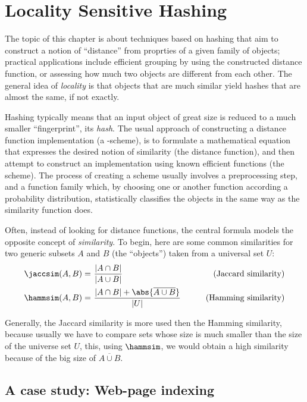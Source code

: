 \chapter{Locality Sensitive Hashing}

The topic of this chapter is about techniques based on hashing that aim to construct a notion of ``distance'' from proprties of a given family of objects; practical applications include efficient grouping by using the constructed distance function, or assessing how much two objects are different from each other. The general idea of \emph{locality} is that objects that are much similar yield hashes that are almost the same, if not exactly.

Hashing typically means that an input object of great size is reduced to a much smaller ``fingerprint'', its \emph{hash}. The usual approach of constructing a distance function implementation (a \lsh-scheme), is to formulate a mathematical equation that expresses the desired notion of similarity (the distance function), and then attempt to construct an implementation using known efficient functions (the scheme). The process of creating a scheme usually involves a preprocessing step, and a function family which, by choosing one or another function according a probability distribution, statistically classifies the objects in the same way as the similarity function does.

Often, instead of looking for distance functions, the central formula models the opposite concept of \emph{similarity}. To begin, here are some common similarities for two generic subsets $A$ and $B$ (the ``objects'') taken from a universal set $U$:
\begin{align*}
    \jaccsim(A, B) =&\ \frac{|A \cap B|}{|A \cup B|}                      & \tag{Jaccard similarity} \\
    \hammsim(A, B) =&\ \frac{|A \cap B| + \abs{\overline{A \cup B}}}{|U|} & \tag{Hamming similarity}
\end{align*}

\begin{observation}
    Generally, the Jaccard similarity is more used then the Hamming similarity, because usually we have to compare sets whose size is much smaller than the size of the universe set $U$, this, using $\hammsim$, we would obtain a high similarity because of the big size of $\overline{A\cup B}$.
\end{observation}


\section{A case study: Web-page indexing}\label{sec:web-page-indexing}

